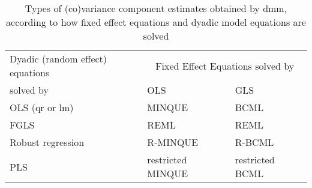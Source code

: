 \begin{table}[h]
\centering
\caption{Types of (co)variance component estimates obtained by dmm,  according to how fixed effect equations and dyadic model equations are solved}
\label{tab.est}
\vspace{0.1in}
\begin{tabular}{|l|l|l|}
\hline
Dyadic (random effect) equations  & \multicolumn{2}{c|}{Fixed Effect Equations solved by}  \\  \cline{2-3}
 solved by   & OLS  & GLS \\ \hline
 OLS (qr or lm) & MINQUE & BCML \\
 FGLS           & REML   & REML \\
 Robust regression & R-MINQUE & R-BCML \\
 PLS            & restricted MINQUE & restricted BCML \\ \hline
\end{tabular}
\end{table}
